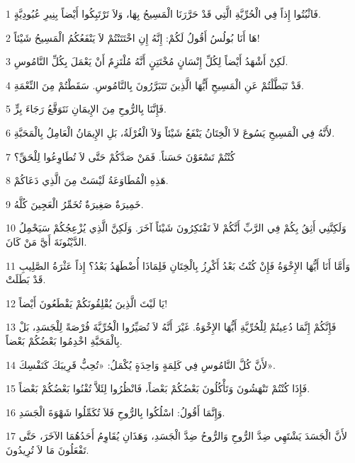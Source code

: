 \par 1 فَاثْبُتُوا إِذاً فِي الْحُرِّيَّةِ الَّتِي قَدْ حَرَّرَنَا الْمَسِيحُ بِهَا، وَلاَ تَرْتَبِكُوا أَيْضاً بِنِيرِ عُبُودِيَّةٍ.
\par 2 هَا أَنَا بُولُسُ أَقُولُ لَكُمْ: إِنَّهُ إِنِ اخْتَتَنْتُمْ لاَ يَنْفَعُكُمُ الْمَسِيحُ شَيْئاً!
\par 3 لَكِنْ أَشْهَدُ أَيْضاً لِكُلِّ إِنْسَانٍ مُخْتَتِنٍ أَنَّهُ مُلْتَزِمٌ أَنْ يَعْمَلَ بِكُلِّ النَّامُوسِ.
\par 4 قَدْ تَبَطَّلْتُمْ عَنِ الْمَسِيحِ أَيُّهَا الَّذِينَ تَتَبَرَّرُونَ بِالنَّامُوسِ. سَقَطْتُمْ مِنَ النِّعْمَةِ.
\par 5 فَإِنَّنَا بِالرُّوحِ مِنَ الإِيمَانِ نَتَوَقَّعُ رَجَاءَ بِرٍّ.
\par 6 لأَنَّهُ فِي الْمَسِيحِ يَسُوعَ لاَ الْخِتَانُ يَنْفَعُ شَيْئاً وَلاَ الْغُرْلَةُ، بَلِ الإِيمَانُ الْعَامِلُ بِالْمَحَبَّةِ.
\par 7 كُنْتُمْ تَسْعَوْنَ حَسَناً. فَمَنْ صَدَّكُمْ حَتَّى لاَ تُطَاوِعُوا لِلْحَقِّ؟
\par 8 هَذِهِ الْمُطَاوَعَةُ لَيْسَتْ مِنَ الَّذِي دَعَاكُمْ.
\par 9 خَمِيرَةٌ صَغِيرَةٌ تُخَمِّرُ الْعَجِينَ كُلَّهُ.
\par 10 وَلَكِنَّنِي أَثِقُ بِكُمْ فِي الرَّبِّ أَنَّكُمْ لاَ تَفْتَكِرُونَ شَيْئاً آخَرَ. وَلَكِنَّ الَّذِي يُزْعِجُكُمْ سَيَحْمِلُ الدَّيْنُونَةَ أَيَّ مَنْ كَانَ.
\par 11 وَأَمَّا أَنَا أَيُّهَا الإِخْوَةُ فَإِنْ كُنْتُ بَعْدُ أَكْرِزُ بِالْخِتَانِ فَلِمَاذَا أُضْطَهَدُ بَعْدُ؟ إِذاً عَثْرَةُ الصَّلِيبِ قَدْ بَطَلَتْ.
\par 12 يَا لَيْتَ الَّذِينَ يُقْلِقُونَكُمْ يَقْطَعُونَ أَيْضاً!
\par 13 فَإِنَّكُمْ إِنَّمَا دُعِيتُمْ لِلْحُرِّيَّةِ أَيُّهَا الإِخْوَةُ. غَيْرَ أَنَّهُ لاَ تُصَيِّرُوا الْحُرِّيَّةَ فُرْصَةً لِلْجَسَدِ، بَلْ بِالْمَحَبَّةِ اخْدِمُوا بَعْضُكُمْ بَعْضاً.
\par 14 لأَنَّ كُلَّ النَّامُوسِ فِي كَلِمَةٍ وَاحِدَةٍ يُكْمَلُ: «تُحِبُّ قَرِيبَكَ كَنَفْسِكَ».
\par 15 فَإِذَا كُنْتُمْ تَنْهَشُونَ وَتَأْكُلُونَ بَعْضُكُمْ بَعْضاً، فَانْظُرُوا لِئَلاَّ تُفْنُوا بَعْضُكُمْ بَعْضاً.
\par 16 وَإِنَّمَا أَقُولُ: اسْلُكُوا بِالرُّوحِ فَلاَ تُكَمِّلُوا شَهْوَةَ الْجَسَدِ.
\par 17 لأَنَّ الْجَسَدَ يَشْتَهِي ضِدَّ الرُّوحِ وَالرُّوحُ ضِدَّ الْجَسَدِ، وَهَذَانِ يُقَاوِمُ أَحَدُهُمَا الآخَرَ، حَتَّى تَفْعَلُونَ مَا لاَ تُرِيدُونَ.
